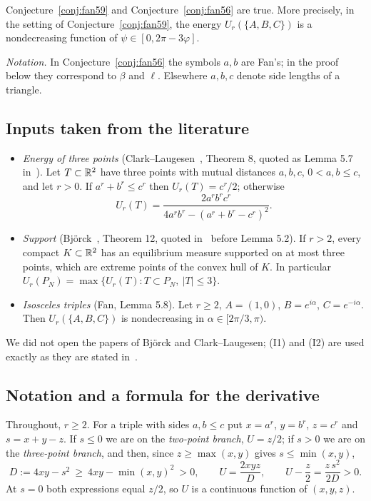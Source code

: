 \begin{theorem}\label{thm:riesz}
Conjecture~\ref{conj:fan59} and Conjecture~\ref{conj:fan56} are true. More precisely, in the setting of Conjecture~\ref{conj:fan59}, the energy $U_r(\{A,B,C\})$ is a nondecreasing function of $\psi\in[0,2\pi-3\varphi]$.
\end{theorem}

\noindent\emph{Notation.} In Conjecture~\ref{conj:fan56} the symbols $a,b$ are Fan's; in the proof below they correspond to $\beta$ and $\ell$. Elsewhere $a,b,c$ denote side lengths of a triangle.\medskip

\subsection{Inputs taken from the literature}
\begin{itemize}[leftmargin=2em]
\item[\textbf{(I1)}] \emph{Energy of three points} (Clark--Laugesen~\cite{CL}, Theorem 8, quoted as Lemma 5.7 in~\cite{Fan}). Let $T\subset\mathbb{R}^2$ have three points with mutual distances $a,b,c$, $0<a,b\le c$, and let $r>0$. If $a^r+b^r\le c^r$ then $U_r(T)=c^r/2$; otherwise
\[
U_r(T)=\frac{2a^rb^rc^r}{4a^rb^r-(a^r+b^r-c^r)^2}.
\]
\item[\textbf{(I2)}] \emph{Support} (Bj\"orck~\cite{Bj}, Theorem 12, quoted in~\cite{Fan} before Lemma 5.2). If $r>2$, every compact $K\subset\mathbb{R}^2$ has an equilibrium measure supported on at most three points, which are extreme points of the convex hull of $K$. In particular $U_r(P_N)=\max\{U_r(T): T\subset P_N,\ |T|\le3\}$.
\item[\textbf{(I3)}] \emph{Isosceles triples} (Fan, Lemma 5.8). Let $r\ge2$, $A=(1,0)$, $B=e^{i\alpha}$, $C=e^{-i\alpha}$. Then $U_r(\{A,B,C\})$ is nondecreasing in $\alpha\in[2\pi/3,\pi)$.
\end{itemize}
We did not open the papers of Bj\"orck and Clark--Laugesen; (I1) and (I2) are used exactly as they are stated in~\cite{Fan}.

\subsection{Notation and a formula for the derivative}
Throughout, $r\ge 2$. For a triple with sides $a,b\le c$ put $x=a^r$, $y=b^r$, $z=c^r$ and $s=x+y-z$. If $s\le0$ we are on the \emph{two-point branch}, $U=z/2$; if $s>0$ we are on the \emph{three-point branch}, and then, since $z\ge\max(x,y)$ gives $s\le\min(x,y)$,
\[
D:=4xy-s^2\ \ge\ 4xy-\min(x,y)^2\ >0,\qquad U=\frac{2xyz}{D},\qquad U-\frac z2=\frac{z\,s^2}{2D}>0 .
\]
At $s=0$ both expressions equal $z/2$, so $U$ is a continuous function of $(x,y,z)$.

